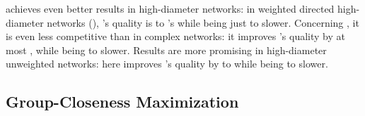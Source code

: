 \greedyh achieves even better results in high-diameter networks: in weighted
directed high-diameter networks (),
\greedyh's quality is
\minQualGRHRndRoadDirWei to \maxQualGRHRndRoadDirWei
\bestrandomh's while being just \minSlowdGRHRoadDirWei to \maxSlowdGRHRoadDirWei
slower.
Concerning \greedylsh, it is even less competitive than in complex networks:
it improves \greedyh's quality by at most \maxQualImprLSGRHRoadDirWei, while being
\minSlowdLSGRHRoadDirWei to \maxSlowdLSGRHRoadDirWei slower. Results are more
promising in high-diameter unweighted networks: here \greedylsh improves
\greedyh's quality by \minQualImprLSGRHRoadUnw to \maxQualImprLSGRHRoadUnw
while being \minSlowdGRHRoadUnw to \maxSlowdGRHRoadUnw slower.


\subsection{Group-Closeness Maximization}
\label{sec:gh-gc:exp-gc-max}

